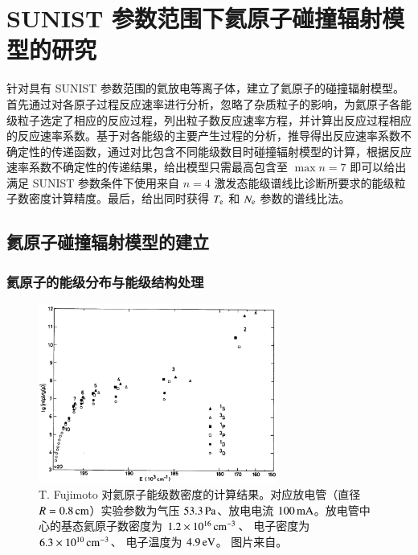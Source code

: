 \graphicspath{{figures/chap03/}}

\chapter{SUNIST 参数范围下氦原子碰撞辐射模型的研究}%
\label{chap:crmodel}

针对具有 SUNIST 参数范围的氦放电等离子体，建立了氦原子的碰撞辐射模型。首先通过对各原子过程反应速率进行分析，忽略了杂质粒子的影响，为氦原子各能级粒子选定了相应的反应过程，列出粒子数反应速率方程，并计算出反应过程相应的反应速率系数。基于对各能级的主要产生过程的分析，推导得出反应速率系数不确定性的传递函数，通过对比包含不同能级数目时碰撞辐射模型的计算，根据反应速率系数不确定性的传递结果，给出模型只需最高包含至 $\max n=7$ 即可以给出满足 SUNIST 参数条件下使用来自 $n=4$ 激发态能级谱线比诊断所要求的能级粒子数密度计算精度。最后，给出同时获得 $T_{\rm e}$ 和 $N_{\rm e}$ 参数的谱线比法。


\section{氦原子碰撞辐射模型的建立}

\subsection{氦原子的能级分布与能级结构处理}
\label{sec:chap03:level-selection}

\begin{figure}%
  \centering
  \includegraphics[width=0.7\textwidth]{fujimoto-level-distribution.jpg}
  \caption{T. Fujimoto 对氦原子能级数密度的计算结果。对应放电管（直径 $R=0.8\,{\rm cm}$）实验参数为气压 $53.3\,{\rm Pa}$、放电电流 $100\,{\rm mA}$。放电管中心的基态氦原子数密度为 $1.2\times10^{16}\,{\rm cm}^{-3}$、 电子密度为 $6.3\times10^{10}\,{\rm cm}^{-3}$、 电子温度为 $4.9\,{\rm eV}$。 图片来自。}
  \label{fig:chap03:fujimoto-level-distribution}
\end{figure}

